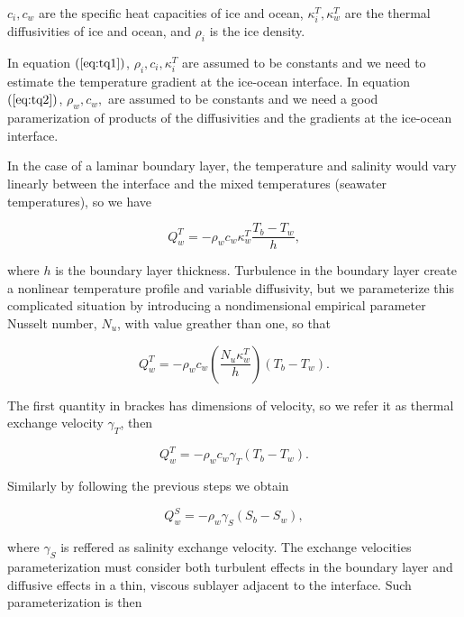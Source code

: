 \documentclass[11pt,a4paper]{article}
\begin{document}
	
		$c_i, c_w$ are the specific heat capacities of ice and ocean, $\kappa_i^T, \kappa_w^T$ are the thermal diffusivities of ice and ocean, and $\rho_i$ is the ice density.
		
		In equation $(\ref{eq:tq1})$, $\rho_i, c_i, \kappa_i^T$ are assumed to be constants and we need to estimate the temperature gradient at the ice-ocean interface. In equation $(\ref{eq:tq2})$, $\rho_w, c_w,$ are assumed to be constants and we need a good paramerization of  products of the diffusivities and the gradients at the ice-ocean interface.
		
		In the case of a laminar boundary layer, the temperature and salinity would vary linearly between the interface and the mixed temperatures (seawater temperatures)\cite{holland1999modeling}, so we have
		
		\begin{equation}
			Q_w^T = -\rho_wc_w\kappa_w^T\dfrac{T_b-T_w}{h},
		\end{equation}
	
		where $h$ is the boundary layer thickness. Turbulence in the boundary layer create a nonlinear temperature profile and variable diffusivity, but we parameterize this complicated situation by introducing a nondimensional empirical parameter Nusselt number, $N_u$, with value greather than one, so that
		
		\begin{equation}
			Q_w^T = -\rho_wc_w\left(\dfrac{N_u\kappa_w^T}{h}\right)\left(T_b-T_w\right).
		\end{equation}
		
		The first quantity in brackes has dimensions of velocity, so we refer it as thermal exchange velocity $\gamma_T$, then 
		
		\begin{equation}
			Q_w^T = -\rho_wc_w\gamma_T(T_b-T_w).
		\end{equation}
	
		Similarly by following the previous steps we obtain
		
		\begin{equation}
			Q_w^S = -\rho_w\gamma_S(S_b-S_w),
		\end{equation}
		
		where $\gamma_S$ is reffered as salinity exchange velocity. The exchange velocities parameterization must consider both turbulent effects in the boundary layer and diffusive effects in a thin, viscous sublayer adjacent to the interface. Such parameterization is then
		
\end{document}
